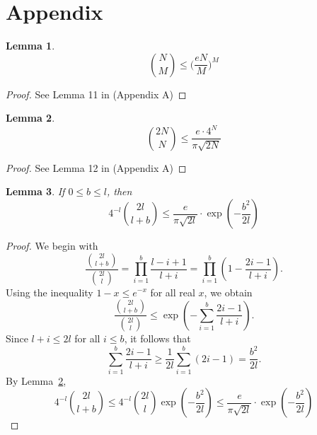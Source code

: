 \documentclass{article}
\newtheorem{lemma}{Lemma}
\newcommand{\E}{\mathbb{E}}
\newcommand{\Ber}{\mathrm{Ber}}
\begin{document}
\section*{Appendix}
\begin{lemma}\label{lemma_N_choose_M}
\[{N\choose M}\le \bigl(\frac{eN}{M}\bigr)^M\]
\end{lemma}
\begin{proof}
    See Lemma 11 in \cite{feige_quantitative_2020} (Appendix A) 
\end{proof}
\begin{lemma}\label{lemma_2N_choose_N}
\[{2N\choose N}\le \frac{e\cdot4^N}{\pi \sqrt{2N}}\]
\end{lemma}
\begin{proof}
    See Lemma 12 in \cite{feige_quantitative_2020} (Appendix A)
\end{proof}
\begin{lemma}\label{lemma_exp}
If $0\le b\le l$, then
    \[4^{-l}{2l \choose l+b}\le \frac{e}{\pi  \sqrt{2l}}\cdot \exp\!\left(-\frac{b^2}{2l}\right)\]
\end{lemma}
\begin{proof}
We begin with
\[
\frac{{2l \choose l+b}}{{2l \choose l}}
= \prod_{i=1}^b \frac{l - i + 1}{l + i}
= \prod_{i=1}^b \left(1 - \frac{2i - 1}{l + i}\right).
\]
Using the inequality $1 - x \le e^{-x}$ for all real $x$, we obtain
\[
\frac{{2l \choose l+b}}{{2l \choose l}}
\le \exp\!\left(-\sum_{i=1}^b \frac{2i - 1}{l + i}\right).
\]
Since $l + i \le 2l$ for all $i \le b$, it follows that
\[
\sum_{i=1}^b \frac{2i - 1}{l + i}
\ge \frac{1}{2l}\sum_{i=1}^b (2i - 1)
= \frac{b^2}{2l}.
\]
By Lemma~\ref{lemma_2N_choose_N}, 
\[4^{-l}{2l \choose l+b}\le 4^{-l}{2l \choose l} \exp\!\left(-\frac{b^2}{2l}\right)
\le \frac{e}{\pi  \sqrt{2l}}\cdot \exp\!\left(-\frac{b^2}{2l}\right)\]
\end{proof}


\end{document}
